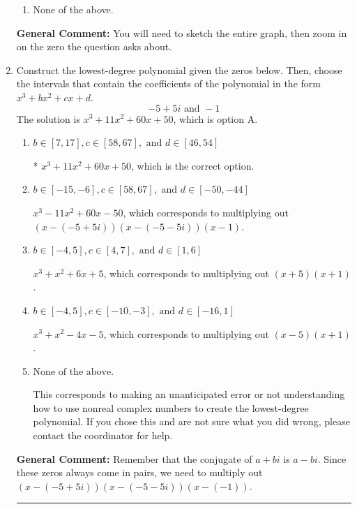 \documentclass{extbook}[14pt]
\newcommand{\litem}[1]{\item #1

\rule{\textwidth}{0.4pt}}
\begin{document}
\begin{enumerate}
{\begin{enumerate}[label=\Alph*.]
\item None of the above.\end{enumerate}
\textbf{General Comment:} You will need to sketch the entire graph, then zoom in on the zero the question asks about.
}
\litem{
Construct the lowest-degree polynomial given the zeros below. Then, choose the intervals that contain the coefficients of the polynomial in the form $x^3+bx^2+cx+d$.
\[ -5 + 5 i \text{ and } -1 \]
The solution is \( x^{3} +11 x^{2} +60 x + 50 \), which is option A.\begin{enumerate}[label=\Alph*.]
\item \( b \in [7, 17], c \in [58, 67], \text{ and } d \in [46, 54] \)

* $x^{3} +11 x^{2} +60 x + 50$, which is the correct option.
\item \( b \in [-15, -6], c \in [58, 67], \text{ and } d \in [-50, -44] \)

$x^{3} -11 x^{2} +60 x -50$, which corresponds to multiplying out $(x-(-5 + 5 i))(x-(-5 - 5 i))(x -1)$.
\item \( b \in [-4, 5], c \in [4, 7], \text{ and } d \in [1, 6] \)

$x^{3} + x^{2} +6 x + 5$, which corresponds to multiplying out $(x + 5)(x + 1)$.
\item \( b \in [-4, 5], c \in [-10, -3], \text{ and } d \in [-16, 1] \)

$x^{3} + x^{2} -4 x -5$, which corresponds to multiplying out $(x -5)(x + 1)$.
\item \( \text{None of the above.} \)

This corresponds to making an unanticipated error or not understanding how to use nonreal complex numbers to create the lowest-degree polynomial. If you chose this and are not sure what you did wrong, please contact the coordinator for help.
\end{enumerate}

\textbf{General Comment:} Remember that the conjugate of $a+bi$ is $a-bi$. Since these zeros always come in pairs, we need to multiply out $(x-(-5 + 5 i))(x-(-5 - 5 i))(x-(-1))$.
}
\end{enumerate}
\end{document}

